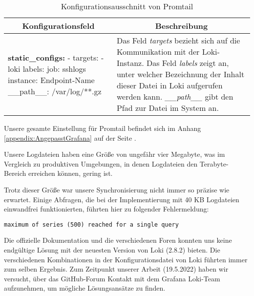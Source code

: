\begin{table}[H]
  \begin{tabularx}{\textwidth}{|m{5.5cm}|X|}
  \hline
  \multicolumn{1}{|c|}{\textbf{Konfigurationsfeld}} & \multicolumn{1}{|c|}{\textbf{Beschreibung}} \\
  \hline
  \textbf{static\_configs:} \newline
  \hphantom{te}- targets: \newline
  \hphantom{te}- loki \newline
  \hphantom{te}labels: \newline
  \hphantom{te}job: sshlogs \newline
  \hphantom{te}instance: \gls{Endpoint}-Name \newline
  \hphantom{te}\_\_path\_\_: /var/log/**.gz & Das Feld \textit{targets} bezieht sich auf die Kommunikation mit der Loki-Instanz. Das Feld \textit{labels} zeigt an, unter welcher Bezeichnung der Inhalt dieser Datei in Loki aufgerufen werden kann. \textit{\_\_path\_\_} gibt den Pfad zur Datei im System an.\\
  \hline
  \end{tabularx}
  \caption[Konfigurationsausschnitt von Promtail]
  {Konfigurationsausschnitt von Promtail}
  \label{tab:KonfigPromtail}
\end{table}

Unsere gesamte Einstellung für Promtail befindet sich im Anhang \ref{appendix:AngepasstGrafana} auf der Seite \pageref{appendix:AngepasstGrafana}.



Unsere Logdateien haben eine Größe von ungefähr vier Megabyte, was im Vergleich zu produktiven Umgebungen, in denen Logdateien den Terabyte-Bereich erreichen können, gering ist. 


Trotz dieser Größe war unsere Synchronisierung nicht immer so präzise wie erwartet. Einige Abfragen, die bei der Implementierung mit 40 KB Logdateien einwandfrei funktionierten, führten hier zu folgender Fehlermeldung:

{
\begin{Verbatim}[fontsize=\small, frame=single]
maximum of series (500) reached for a single query  
\end{Verbatim}
}

Die offizielle Dokumentation und die verschiedenen Foren konnten uns keine endgültige Lösung mit der neuesten Version von Loki (2.8.2) bieten. Die verschiedenen Kombinationen in der Konfigurationsdatei von Loki führten immer zum selben Ergebnis. Zum Zeitpunkt unserer Arbeit (19.5.2022) haben wir versucht, über das GitHub-Forum Kontakt mit dem Grafana Loki-Team aufzunehmen, um mögliche Lösungsansätze zu finden.

